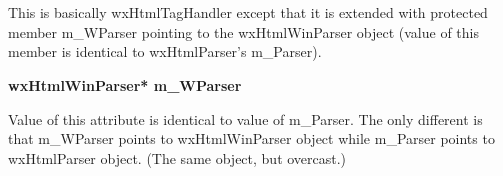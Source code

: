 %
%

\section{}\label{wxhtmlwintaghandler}

This is basically wxHtmlTagHandler except that
it is extended with protected member m\_WParser pointing to
the wxHtmlWinParser object (value of this member is identical
to wxHtmlParser's m\_Parser).




\label{wxhtmlwintaghandlerwxhtmlwintaghandlermwparser}

{\bf wxHtmlWinParser* m\_WParser}

Value of this attribute is identical to value of m\_Parser. The only different
is that m\_WParser points to wxHtmlWinParser object while m\_Parser
points to wxHtmlParser object. (The same object, but overcast.)

